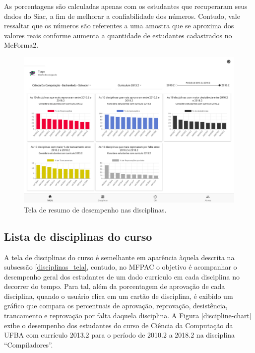 As porcentagens são calculadas apenas com os estudantes que recuperaram seus dados do Siac, a fim de melhorar a confiabilidade dos números. Contudo, vale ressaltar que os números são referentes a uma amostra que se aproxima dos valores reais conforme aumenta a quantidade de estudantes cadastrados no MeForma2.

\begin{figure}[H]
	   \centering
	   		\includegraphics[scale=0.15]{pics/c3/15-charts.png}
	   \caption{Tela de resumo de desempenho nas disciplinas.}
	   \label{charts}
\end{figure}

\subsection{Lista de disciplinas do curso}

A tela de disciplinas do curso é semelhante em aparência àquela descrita na subsessão \ref{disciplinas_tela}, contudo, no MFPAC o objetivo é acompanhar o desempenho geral dos estudantes de um dado currículo em cada disciplina no decorrer do tempo. Para tal, além da porcentagem de aprovação de cada disciplina, quando o usuário clica em um cartão de disciplina, é exibido um gráfico que compara os percentuais de aprovação, reprovação, desistência, trancamento e reprovação por falta daquela disciplina. A Figura \ref{discipline-chart} exibe o desempenho dos estudantes do curso de Ciência da Computação da UFBA com currículo 2013.2 para o período de 2010.2 a 2018.2 na disciplina ``Compiladores''.

